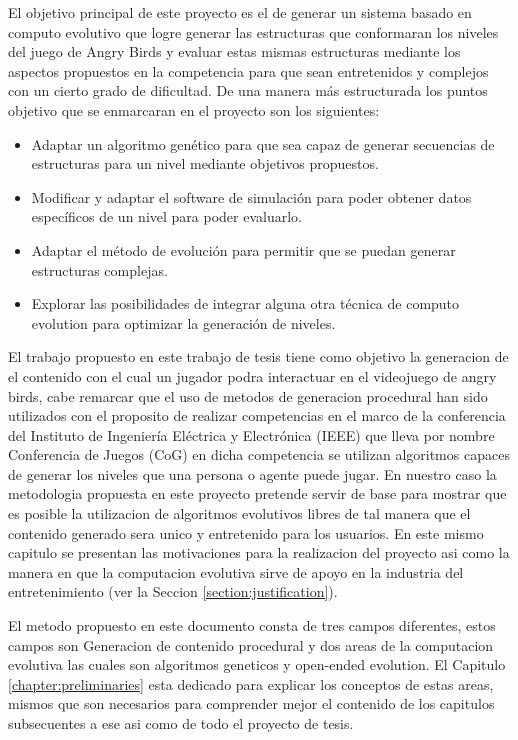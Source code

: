 El objetivo principal de este proyecto es el de generar un sistema basado en
computo evolutivo que logre generar las estructuras que conformaran los niveles
del juego de Angry Birds y evaluar estas mismas estructuras mediante los
aspectos propuestos en la competencia para que sean entretenidos y complejos con
un cierto grado de dificultad. De una manera más estructurada los puntos
objetivo que se enmarcaran en el proyecto son los siguientes: 

\begin{itemize}
  \item Adaptar un algoritmo genético para que sea capaz de generar secuencias
  de estructuras para un nivel mediante objetivos propuestos.
  \item Modificar y adaptar el software de simulación para poder obtener datos
  específicos de un nivel para poder evaluarlo.
  \item Adaptar el método de evolución para permitir que se puedan generar
  estructuras complejas.
  \item Explorar las posibilidades de integrar alguna otra técnica de computo
  evolution para optimizar la generación de niveles.
\end{itemize} 

El trabajo propuesto en este trabajo de tesis tiene como objetivo la generacion
de el contenido con el cual un jugador podra interactuar en el videojuego de
angry birds, cabe remarcar que el uso de metodos de generacion procedural han
sido utilizados con el proposito de realizar competencias en el marco de la
conferencia del Instituto de Ingeniería Eléctrica y Electrónica (IEEE) que lleva
por nombre Conferencia de Juegos (CoG) en dicha competencia se utilizan
algoritmos capaces de generar los niveles que una persona o agente puede jugar.
En nuestro caso la metodologia propuesta en este proyecto pretende servir de
base para mostrar que es posible la utilizacion de algoritmos evolutivos libres
de tal manera que el contenido generado sera unico y entretenido para los
usuarios. En este mismo capitulo se presentan las motivaciones para la
realizacion del proyecto asi como la manera en que la computacion evolutiva
sirve de apoyo en la industria del entretenimiento (ver la Seccion
\ref{section:justification}).

El metodo propuesto en este documento consta de tres campos diferentes, estos
campos son Generacion de contenido procedural y dos areas de la computacion
evolutiva las cuales son algoritmos geneticos y open-ended evolution. El
Capitulo \ref{chapter:preliminaries} esta dedicado para explicar los conceptos
de estas areas, mismos que son necesarios para comprender mejor el contenido de
los capitulos subsecuentes a ese asi como de todo el proyecto de tesis.

